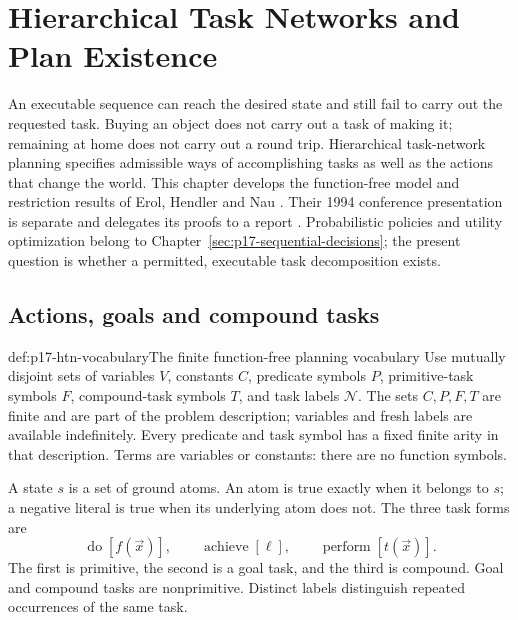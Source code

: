 \chapter{Hierarchical Task Networks and Plan Existence}
\label{sec:p17-hierarchical-task-network-reasoning}

An executable sequence can reach the desired state and still fail to carry out
the requested task. Buying an object does not carry out a task of making it;
remaining at home does not carry out a round trip. Hierarchical task-network
planning specifies admissible ways of accomplishing tasks as well as the
actions that change the world. This chapter develops the function-free model
and restriction results of Erol, Hendler and Nau
\cite{ErolHendlerNau1996HTNComplexity}. Their 1994 conference presentation is
separate and delegates its proofs to a report
\cite{ErolHendlerNau1994HTN}. Probabilistic policies and utility optimization
belong to Chapter~\ref{sec:p17-sequential-decisions}; the present question is
whether a permitted, executable task decomposition exists.

\section{Actions, goals and compound tasks}
\label{sec:p17-htn-language}

\begin{hbdefinition}{def:p17-htn-vocabulary}{The finite function-free planning vocabulary}
Use mutually disjoint sets of variables \(V\), constants \(C\), predicate
symbols \(P\), primitive-task symbols \(F\), compound-task symbols \(T\), and
task labels \(\mathcal N\). The sets \(C,P,F,T\) are finite and are part of
the problem description; variables and fresh labels are available indefinitely.
Every predicate and task symbol has a fixed finite arity in that description.
Terms are variables or constants: there are no function symbols.

A state \(s\) is a set of ground atoms. An atom is true exactly when it belongs
to \(s\); a negative literal is true when its underlying atom does not.
The three task forms are
\[
 \operatorname{do}[f(\vec x)],\qquad
 \operatorname{achieve}[\ell],\qquad
 \operatorname{perform}[t(\vec x)].
\]
The first is primitive, the second is a goal task, and the third is compound.
Goal and compound tasks are nonprimitive. Distinct labels distinguish repeated
occurrences of the same task.
\end{hbdefinition}

